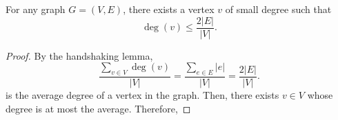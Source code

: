 
\begin{lemma}
	For any graph \( G = (V,E) \), there exists a vertex \( v \) of small degree such that \[
		\deg(v) \le \frac{2|E|}{|V|}
	.\] 
\end{lemma}
\begin{proof}
	By the handshaking lemma, \[
		\frac{\sum_{v \in V} \deg(v)}{|V|} = \frac{\sum_{e \in E}|e|}{|V|} = \frac{2|E|}{|V|}
	.\] is the average degree of a vertex in the graph. Then, there exists \( v \in V \) whose degree is at most the average. Therefore, 
\end{proof} 
